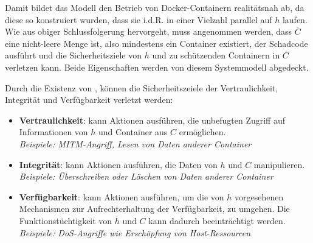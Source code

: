 \documentclass[../main.tex]{subfiles}
\begin{document}
    Damit bildet das Modell den Betrieb von Docker-Containern realitätsnah ab, da diese so konstruiert wurden, dass sie i.d.R. in einer Vielzahl parallel auf \(h\) laufen. Wie aus obiger Schlussfolgerung hervorgeht, muss angenommen werden, dass \(\overline{C}\) eine nicht-leere Menge ist, also mindestens ein Container \cbroken{} existiert, der Schadcode ausführt und die Sicherheitsziele von \(h\) und zu schützenden Containern in \(C\) verletzen kann. Beide Eigenschaften werden von diesem Systemmodell abgedeckt.





    Durch die Existenz von \cbroken{}, können die Sicherheitszeiele der Vertraulichkeit, Integrität und Verfügbarkeit verletzt werden:

    \begin{itemize}
      \item \textbf{Vertraulichkeit}: \cbroken{} kann Aktionen ausführen, die unbefugten Zugriff auf Informationen von \(h\) und Container aus \(C\) ermöglichen.\\
      \emph{Beispiele: MITM-Angriff, Lesen von Daten anderer Container}
      \item \textbf{Integrität}: \cbroken{} kann Aktionen ausführen, die Daten von \(h\) und \(C\) manipulieren.\\
      \emph{Beispiele: Überschreiben oder Löschen von Daten anderer Container}
      \item \textbf{Verfügbarkeit}: \cbroken{} kann Aktionen ausführen, um die von \(h\) vorgesehenen Mechanismen zur Aufrechterhaltung der Verfügbarkeit, zu umgehen. Die Funktionstüchtigkeit von \(h\) und \(C\) kann dadurch beeinträchtigt werden.\\
      \emph{Beispiele: DoS-Angriffe wie Erschöpfung von Host-Ressourcen}
    \end{itemize}
\end{document}
